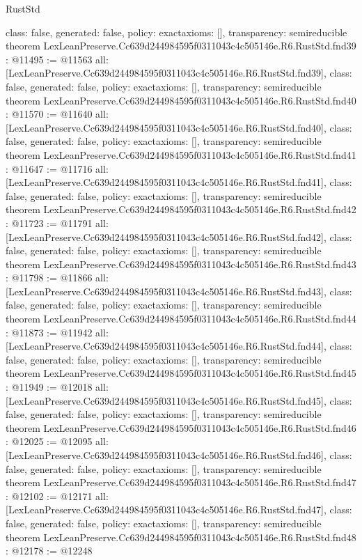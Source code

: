 \begin{lexlean}{RustStd}
\begin{coremodule}
{  class: false,
  generated: false,
  policy: exact{axioms: []},
  transparency: semireducible
}
theorem LexLeanPreserve.Cc639d244984595f0311043c4c505146e.R6.RustStd.fnd39 : @11495 := @11563 {
  all: [LexLeanPreserve.Cc639d244984595f0311043c4c505146e.R6.RustStd.fnd39],
  class: false,
  generated: false,
  policy: exact{axioms: []},
  transparency: semireducible
}
theorem LexLeanPreserve.Cc639d244984595f0311043c4c505146e.R6.RustStd.fnd40 : @11570 := @11640 {
  all: [LexLeanPreserve.Cc639d244984595f0311043c4c505146e.R6.RustStd.fnd40],
  class: false,
  generated: false,
  policy: exact{axioms: []},
  transparency: semireducible
}
theorem LexLeanPreserve.Cc639d244984595f0311043c4c505146e.R6.RustStd.fnd41 : @11647 := @11716 {
  all: [LexLeanPreserve.Cc639d244984595f0311043c4c505146e.R6.RustStd.fnd41],
  class: false,
  generated: false,
  policy: exact{axioms: []},
  transparency: semireducible
}
theorem LexLeanPreserve.Cc639d244984595f0311043c4c505146e.R6.RustStd.fnd42 : @11723 := @11791 {
  all: [LexLeanPreserve.Cc639d244984595f0311043c4c505146e.R6.RustStd.fnd42],
  class: false,
  generated: false,
  policy: exact{axioms: []},
  transparency: semireducible
}
theorem LexLeanPreserve.Cc639d244984595f0311043c4c505146e.R6.RustStd.fnd43 : @11798 := @11866 {
  all: [LexLeanPreserve.Cc639d244984595f0311043c4c505146e.R6.RustStd.fnd43],
  class: false,
  generated: false,
  policy: exact{axioms: []},
  transparency: semireducible
}
theorem LexLeanPreserve.Cc639d244984595f0311043c4c505146e.R6.RustStd.fnd44 : @11873 := @11942 {
  all: [LexLeanPreserve.Cc639d244984595f0311043c4c505146e.R6.RustStd.fnd44],
  class: false,
  generated: false,
  policy: exact{axioms: []},
  transparency: semireducible
}
theorem LexLeanPreserve.Cc639d244984595f0311043c4c505146e.R6.RustStd.fnd45 : @11949 := @12018 {
  all: [LexLeanPreserve.Cc639d244984595f0311043c4c505146e.R6.RustStd.fnd45],
  class: false,
  generated: false,
  policy: exact{axioms: []},
  transparency: semireducible
}
theorem LexLeanPreserve.Cc639d244984595f0311043c4c505146e.R6.RustStd.fnd46 : @12025 := @12095 {
  all: [LexLeanPreserve.Cc639d244984595f0311043c4c505146e.R6.RustStd.fnd46],
  class: false,
  generated: false,
  policy: exact{axioms: []},
  transparency: semireducible
}
theorem LexLeanPreserve.Cc639d244984595f0311043c4c505146e.R6.RustStd.fnd47 : @12102 := @12171 {
  all: [LexLeanPreserve.Cc639d244984595f0311043c4c505146e.R6.RustStd.fnd47],
  class: false,
  generated: false,
  policy: exact{axioms: []},
  transparency: semireducible
}
theorem LexLeanPreserve.Cc639d244984595f0311043c4c505146e.R6.RustStd.fnd48 : @12178 := @12248 {
}
\end{coremodule}
\end{lexlean}
